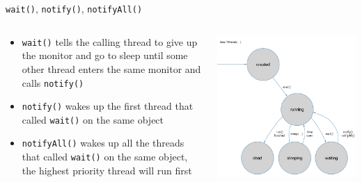 \begin{frame}{\lstinline!wait()!, \lstinline!notify()!, \lstinline!notifyAll()!}
  \begin{columns}[c]
    \begin{column}{0.5\textwidth}
      \begin{itemize}
      \item \lstinline!wait()! tells the calling thread to give up the
        monitor and go to sleep until some other thread enters the
        same monitor and calls \lstinline!notify()!
      \item \lstinline!notify()! wakes up the first thread that called
        \lstinline!wait()! on the same object
      \item \lstinline!notifyAll()! wakes up all the threads that
        called \lstinline!wait()! on the same object, the highest
        priority thread will run first
      \end{itemize}
    \end{column}
    \begin{column}{0.5\textwidth}
      \begin{center}
        \includegraphics[width=\textwidth]{figures/thread}
      \end{center}
    \end{column}
  \end{columns}
\end{frame}

